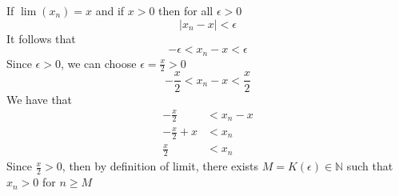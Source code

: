 \documentclass{article}
\begin{document}
If $\lim(x_n) = x$ and if $x > 0$ then for all $\epsilon > 0$
\begin{equation*}
    |x_n - x| < \epsilon 
\end{equation*}
It follows that 
\begin{equation*}
    -\epsilon < x_n - x < \epsilon 
\end{equation*}
Since $\epsilon > 0$, we can choose $\epsilon = \frac{x}{2} > 0$
\begin{equation*}
    -\frac{x}{2} < x_n - x < \frac{x}{2}
\end{equation*}
We have that 
\begin{align*}
    -\frac{x}{2} & < x_n - x \\
    -\frac{x}{2} + x & < x_n \\
    \frac{x}{2} & < x_n
\end{align*}
Since $\frac{x}{2} > 0$, then by definition of limit, there exists $M = K(\epsilon) \in \mathbb{N}$ such that $x_n > 0$ for $n \ge M$
\end{document}
